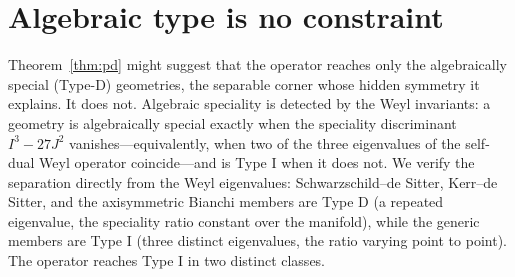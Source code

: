 \documentclass[11pt,a4paper]{article}
\theoremstyle{definition}
\begin{document}
\section{Algebraic type is no constraint}\label{sec:petrov}

Theorem~\ref{thm:pd} might suggest that the operator reaches only the algebraically special (Type-D) geometries, the separable corner whose hidden symmetry it explains. It does not. Algebraic speciality is detected by the Weyl invariants: a geometry is algebraically special exactly when the speciality discriminant $I^{3}-27J^{2}$ vanishes---equivalently, when two of the three eigenvalues of the self-dual Weyl operator coincide---and is Type I when it does not. We verify the separation directly from the Weyl eigenvalues: Schwarzschild--de Sitter, Kerr--de Sitter, and the axisymmetric Bianchi members are Type D (a repeated eigenvalue, the speciality ratio constant over the manifold), while the generic members are Type I (three distinct eigenvalues, the ratio varying point to point). The operator reaches Type I in two distinct classes.
\end{document}
